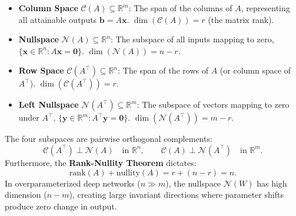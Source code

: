 \documentclass[11pt,a4paper]{article}
\begin{document}
	\begin{itemize}[nosep]
		\item \textbf{Column Space} $\mathcal{C}(A) \subseteq \mathbb{R}^m$: The span of the columns of $A$, representing all attainable outputs $\mathbf{b} = A\mathbf{x}$. $\dim(\mathcal{C}(A)) = r$ (the matrix rank).
		\item \textbf{Nullspace} $\mathcal{N}(A) \subseteq \mathbb{R}^n$: The subspace of all inputs mapping to zero, $\{\mathbf{x} \in \mathbb{R}^n : A\mathbf{x} = \mathbf{0}\}$. $\dim(\mathcal{N}(A)) = n - r$.
		\item \textbf{Row Space} $\mathcal{C}(A^{\!\top}) \subseteq \mathbb{R}^n$: The span of the rows of $A$ (or column space of $A^{\!\top}$). $\dim(\mathcal{C}(A^{\!\top})) = r$.
		\item \textbf{Left Nullspace} $\mathcal{N}(A^{\!\top}) \subseteq \mathbb{R}^m$: The subspace of vectors mapping to zero under $A^{\!\top}$, $\{\mathbf{y} \in \mathbb{R}^m : A^{\!\top}\mathbf{y} = \mathbf{0}\}$. $\dim(\mathcal{N}(A^{\!\top})) = m - r$.
	\end{itemize}

	\begin{keyconcept}
		The four subspaces are pairwise orthogonal complements:
		\begin{equation}
			\mathcal{C}(A^{\!\top}) \perp \mathcal{N}(A) \quad\text{in } \mathbb{R}^n, \qquad
			\mathcal{C}(A) \perp \mathcal{N}(A^{\!\top}) \quad\text{in } \mathbb{R}^m.
		\end{equation}
		Furthermore, the \textbf{Rank-Nullity Theorem} dictates:
		\begin{equation}
			\mathrm{rank}(A) + \mathrm{nullity}(A) = r + (n - r) = n.
		\end{equation}
		In overparameterized deep networks ($n \gg m$), the nullspace $\mathcal{N}(W)$ has high dimension ($n - m$), creating large invariant directions where parameter shifts produce zero change in output.
	\end{keyconcept}

	\begin{practicebox}

	\end{practicebox}
\end{document}
